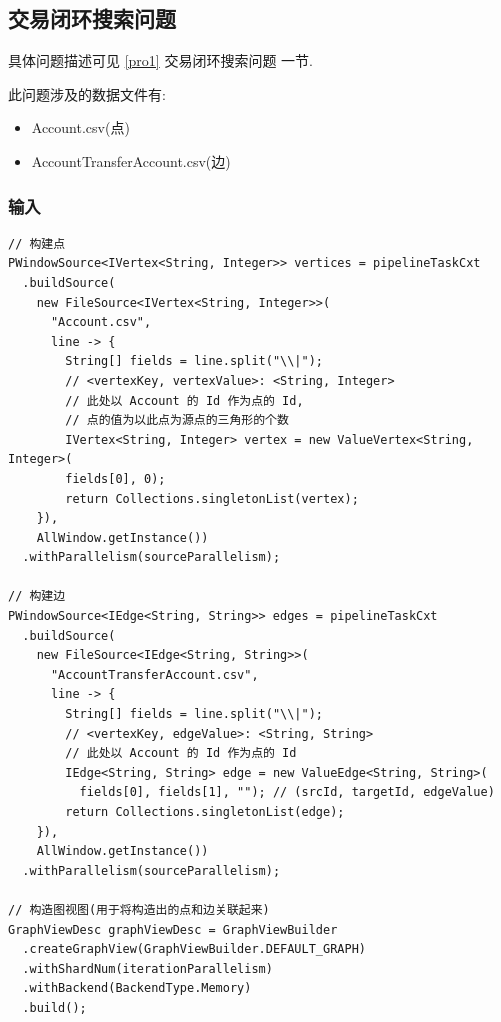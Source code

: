 \subsection{交易闭环搜索问题}
具体问题描述可见 \ref{pro1} 交易闭环搜索问题 一节.

此问题涉及的数据文件有:
\begin{itemize}
  \item Account.csv(点)
  \item AccountTransferAccount.csv(边)
\end{itemize}

\subsubsection{输入}
\begin{center}
\begin{verbatim}
// 构建点
PWindowSource<IVertex<String, Integer>> vertices = pipelineTaskCxt
  .buildSource(
    new FileSource<IVertex<String, Integer>>(
      "Account.csv",
      line -> {
        String[] fields = line.split("\\|");
        // <vertexKey, vertexValue>: <String, Integer>
        // 此处以 Account 的 Id 作为点的 Id,
        // 点的值为以此点为源点的三角形的个数
        IVertex<String, Integer> vertex = new ValueVertex<String, Integer>(
        fields[0], 0);
        return Collections.singletonList(vertex);
    }),
    AllWindow.getInstance())
  .withParallelism(sourceParallelism);

// 构建边
PWindowSource<IEdge<String, String>> edges = pipelineTaskCxt
  .buildSource(
    new FileSource<IEdge<String, String>>(
      "AccountTransferAccount.csv",
      line -> {
        String[] fields = line.split("\\|");
        // <vertexKey, edgeValue>: <String, String>
        // 此处以 Account 的 Id 作为点的 Id
        IEdge<String, String> edge = new ValueEdge<String, String>(
          fields[0], fields[1], ""); // (srcId, targetId, edgeValue)
        return Collections.singletonList(edge);
    }),
    AllWindow.getInstance())
  .withParallelism(sourceParallelism);

// 构造图视图(用于将构造出的点和边关联起来)
GraphViewDesc graphViewDesc = GraphViewBuilder
  .createGraphView(GraphViewBuilder.DEFAULT_GRAPH)
  .withShardNum(iterationParallelism)
  .withBackend(BackendType.Memory)
  .build();
\end{verbatim}
\end{center}

